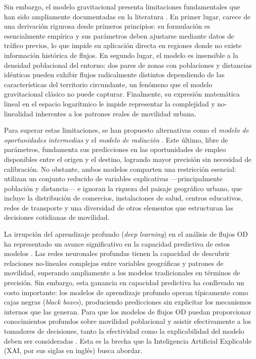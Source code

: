 Sin embargo, el modelo gravitacional presenta limitaciones fundamentales que han sido ampliamente documentadas en la literatura \cite{simini2012universal}. En primer lugar, carece de una derivación rigurosa desde primeros principios: su formulación es esencialmente empírica y sus parámetros deben ajustarse mediante datos de tráfico previos, lo que impide su aplicación directa en regiones donde no existe información histórica de flujos. En segundo lugar, el modelo es insensible a la densidad poblacional del entorno: dos pares de zonas con poblaciones y distancias idénticas pueden exhibir flujos radicalmente distintos dependiendo de las características del territorio circundante, un fenómeno que el modelo gravitacional clásico no puede capturar. Finalmente, su expresión matemática lineal en el espacio logarítmico le impide representar la complejidad y no-linealidad inherentes a los patrones reales de movilidad urbana.

Para superar estas limitaciones, se han propuesto alternativas como el \textit{modelo de oportunidades intermedias} \cite{stouffer1940intervening} y el \textit{modelo de radiación} \cite{simini2012universal}. Este último, libre de parámetros, fundamenta sus predicciones en las oportunidades de empleo disponibles entre el origen y el destino, logrando mayor precisión sin necesidad de calibración. No obstante, ambos modelos comparten una restricción esencial: utilizan un conjunto reducido de variables explicativas —principalmente población y distancia— e ignoran la riqueza del paisaje geográfico urbano, que incluye la distribución de comercios, instalaciones de salud, centros educativos, redes de transporte y una diversidad de otros elementos que estructuran las decisiones cotidianas de movilidad.

La irrupción del aprendizaje profundo (\textit{deep learning}) en el análisis de flujos OD ha representado un avance significativo en la capacidad predictiva de estos modelos \cite{liu2024interdisciplinary}. Las redes neuronales profundas tienen la capacidad de descubrir relaciones no-lineales complejas entre variables geográficas y patrones de movilidad, superando ampliamente a los modelos tradicionales en términos de precisión. Sin embargo, esta ganancia en capacidad predictiva ha conllevado un costo importante: los modelos de aprendizaje profundo operan típicamente como cajas negras (\textit{black boxes}), produciendo predicciones sin explicitar los mecanismos internos que las generan. Para que los modelos de flujos OD puedan proporcionar conocimientos profundos sobre movilidad poblacional y asistir efectivamente a los tomadores de decisiones, tanto la efectividad como la explicabilidad del modelo deben ser consideradas \cite{liu2024interdisciplinary}. Esta es la brecha que la Inteligencia Artificial Explicable (XAI, por sus siglas en inglés) busca abordar.


